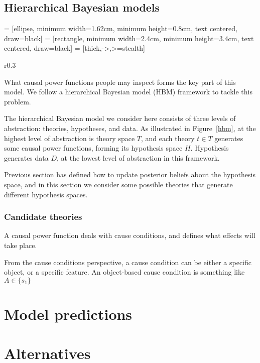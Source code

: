 \documentclass{article}
\begin{document}
\subsection*{Hierarchical Bayesian models}

 = [ellipse, minimum width=1.62cm, minimum height=0.8cm, text centered, draw=black]
 = [rectangle, minimum width=2.4cm, minimum height=3.4cm, text centered, draw=black]
 = [thick,->,>=stealth]
\begin{wrapfigure}{r}{0.3\textwidth}
\begin{center}
	\caption{A hierarchical Bayesian model.}
	\label{hbm}
\end{center}
\end{wrapfigure}

What causal power functions people may inspect forms the key part of this model. We follow a hierarchical Bayesian model (HBM) framework to tackle this problem.

The hierarchical Bayesian model we consider here consists of three levels of abstraction: theories, hypotheses, and data. As illustrated in Figure~\ref{hbm}, at the highest level of abstraction is theory space $T$, and each theory $t \in T$ generates some causal power functions, forming its hypothesis space $H$. Hypothesis generates data $D$, at the lowest level of abstraction in this framework.

Previous section has defined how to update posterior beliefs about the hypothesis space, and in this section we consider some possible theories that generate different hypothesis spaces.

\subsubsection*{Candidate theories}

A causal power function deals with cause conditions, and defines what effects will take place.

From the cause conditions perspective, a cause condition can be either a specific object, or a specific feature. An object-based cause condition is something like $A \in \{s_1\}$


\section{Model predictions}

\section{Alternatives}
\end{document}

